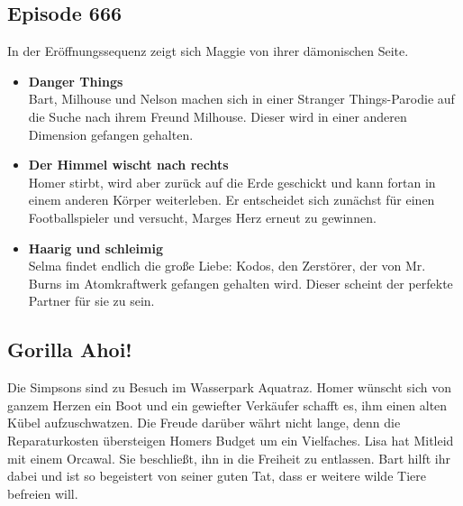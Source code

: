 \subsection{Episode 666}\label{YABF18}
In der Eröffnungssequenz zeigt sich Maggie von ihrer dämonischen Seite.
\begin{itemize}
  \item \textbf{Danger Things}\\ Bart, Milhouse und Nelson machen sich in einer \glqq Stranger Things\grqq-Parodie auf die Suche nach ihrem Freund Milhouse. Dieser wird in einer anderen Dimension gefangen gehalten.
  \item \textbf{Der Himmel wischt nach rechts}\\ Homer stirbt, wird aber zurück auf die Erde geschickt und kann fortan in einem anderen Körper weiterleben. Er entscheidet sich zunächst für einen Footballspieler und versucht, Marges Herz erneut zu gewinnen.
  \item  \textbf{Haarig und schleimig}\\ Selma findet endlich die große Liebe: Kodos, den Zerstörer, der von Mr. Burns im Atomkraftwerk gefangen gehalten wird. Dieser scheint der perfekte Partner für sie zu sein.
\end{itemize}


\subsection{Gorilla Ahoi!}\label{YABF20}
Die Simpsons sind zu Besuch im Wasserpark \glqq Aquatraz\grqq. Homer wünscht sich von ganzem Herzen ein Boot und ein gewiefter Verkäufer schafft es, ihm einen alten Kübel aufzuschwatzen. Die Freude darüber währt nicht lange, denn die Reparaturkosten übersteigen Homers Budget um ein Vielfaches. Lisa hat Mitleid mit einem Orcawal. Sie beschließt, ihn in die Freiheit zu entlassen. Bart hilft ihr dabei und ist so begeistert von seiner guten Tat, dass er weitere wilde Tiere befreien will.


